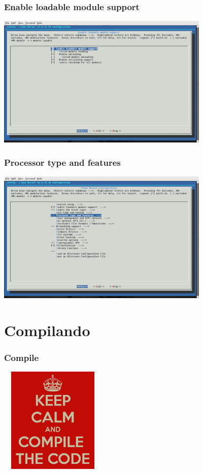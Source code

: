 \documentclass{beamer}
\begin{document}
\begin{frame}
 \frametitle{Enable loadable module support}
 \includegraphics[height = 2.5in, width=4in]
  {images/EnableLoadableModuleSupport.png}
\end{frame}

\begin{frame}
 \frametitle{Processor type and features}
 \includegraphics[height = 2.5in, width=4in]
  {images/ProcessoTypeAndFeature.png}
\end{frame}

\section{Compilando}

\begin{frame}
 \frametitle{Compile}
  \begin{center}
    \includegraphics[height = 2in, width=2in]{images/compile.png}
  \end{center}
\end{frame}
\end{document}
